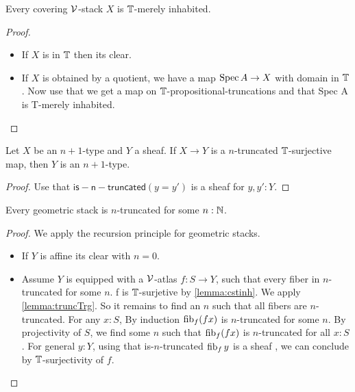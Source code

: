 \begin{lemma}{\label{lemma:cstinh}}
	Every covering $\mathcal{V}$-stack $X$ is $\mathbb{T}$-merely inhabited.
\end{lemma}
\begin{proof} 
	\begin{itemize}
		\item If $X$ is in $\mathbb{T}$ then its clear.
		\item  If $X$ is obtained by a quotient, we have a map $\operatorname{Spec} A \to X$ with domain in $\mathbb{T}$. Now use that we get a map on $\mathbb{T}$-propositional-truncations and that Spec A is T-merely inhabited.
	\end{itemize}
\end{proof}
\begin{lemma}{\label{lemma:truncTrg}}
	Let $X$ be an $n+1$-type and $Y$ a sheaf. If $X \to Y$ is a $n$-truncated $\mathbb{T}$-surjective map, then $Y$ is an $n+1$-type.
\end{lemma}
\begin{proof}
	Use that $\mathsf{is-n-truncated} (y=y')$ is a sheaf for $y , y' : Y.$
\end{proof}
\begin{theorem}
	Every geometric stack is $n$-truncated for some $n : \mathbb{N}$.
\end{theorem}
\begin{proof}
	We apply the recursion principle for geometric stacks.
	\begin{itemize}
		\item If $Y$ is affine its clear with $n = 0$.
		\item Assume $Y$ is equipped with a $\mathcal{V}$-atlas $f : S \to Y$, such that every fiber in $n$-truncated for some $n$. f is $\mathbb{T}$-surjetive by \ref{lemma:cstinh}.
		We apply \ref{lemma:truncTrg}.
		So it remains to find an $n$ such that all fibers are $n$-truncated.
		For any $x : S$, By induction $\operatorname{fib}_f (f x)$ is $n$-truncated for some $n$. By projectivity of $S$, we find some $n$ such that $\operatorname{fib}_f (f x)$ is $n$-truncated for all $x : S$. For general $y : Y$, using that is-$n$-truncated $\operatorname{fib}_f y$ is a sheaf , we can conclude by $\mathbb{T}$-surjectivity of $f$.
	\end{itemize}
	
	
\end{proof}